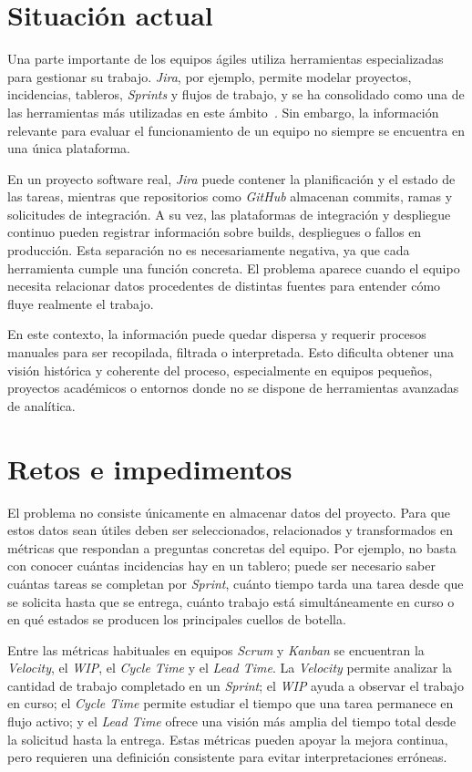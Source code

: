 \section{Situación actual}

Una parte importante de los equipos ágiles utiliza herramientas especializadas para gestionar su trabajo. \textit{Jira}, por ejemplo, permite modelar proyectos, incidencias, tableros, \textit{Sprints} y flujos de trabajo, y se ha consolidado como una de las herramientas más utilizadas en este ámbito~\cite{AtlassianJira}. Sin embargo, la información relevante para evaluar el funcionamiento de un equipo no siempre se encuentra en una única plataforma.

En un proyecto software real, \textit{Jira} puede contener la planificación y el estado de las tareas, mientras que repositorios como \textit{GitHub} almacenan commits, ramas y solicitudes de integración. A su vez, las plataformas de integración y despliegue continuo pueden registrar información sobre builds, despliegues o fallos en producción. Esta separación no es necesariamente negativa, ya que cada herramienta cumple una función concreta. El problema aparece cuando el equipo necesita relacionar datos procedentes de distintas fuentes para entender cómo fluye realmente el trabajo.

En este contexto, la información puede quedar dispersa y requerir procesos manuales para ser recopilada, filtrada o interpretada. Esto dificulta obtener una visión histórica y coherente del proceso, especialmente en equipos pequeños, proyectos académicos o entornos donde no se dispone de herramientas avanzadas de analítica.

\section{Retos e impedimentos}

El problema no consiste únicamente en almacenar datos del proyecto. Para que estos datos sean útiles deben ser seleccionados, relacionados y transformados en métricas que respondan a preguntas concretas del equipo. Por ejemplo, no basta con conocer cuántas incidencias hay en un tablero; puede ser necesario saber cuántas tareas se completan por \textit{Sprint}, cuánto tiempo tarda una tarea desde que se solicita hasta que se entrega, cuánto trabajo está simultáneamente en curso o en qué estados se producen los principales cuellos de botella.

Entre las métricas habituales en equipos \textit{Scrum} y \textit{Kanban} se encuentran la \textit{Velocity}, el \textit{WIP}, el \textit{Cycle Time} y el \textit{Lead Time}. La \textit{Velocity} permite analizar la cantidad de trabajo completado en un \textit{Sprint}; el \textit{WIP} ayuda a observar el trabajo en curso; el \textit{Cycle Time} permite estudiar el tiempo que una tarea permanece en flujo activo; y el \textit{Lead Time} ofrece una visión más amplia del tiempo total desde la solicitud hasta la entrega. Estas métricas pueden apoyar la mejora continua, pero requieren una definición consistente para evitar interpretaciones erróneas.

